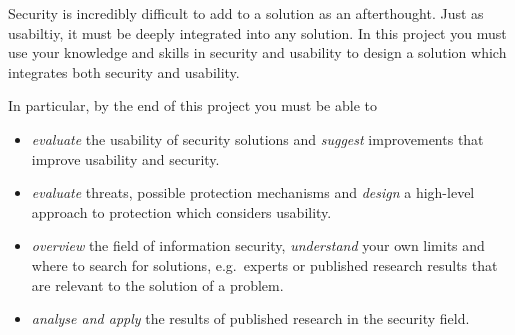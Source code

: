 Security is incredibly difficult to add to a solution as an afterthought.
Just as usabiltiy, it must be deeply integrated into any solution.
In this project you must use your knowledge and skills in security and 
usability to design a solution which integrates both security and usability.

In particular, by the end of this project you must be able to
\begin{itemize}
  \item \emph{evaluate} the usability of security solutions and \emph{suggest} 
    improvements that improve usability and security.
  \item \emph{evaluate} threats, possible protection mechanisms and 
    \emph{design} a high-level approach to protection which considers 
    usability.
  \item \emph{overview} the field of information security, \emph{understand} 
    your own limits and where to search for solutions, e.g.\ experts or 
    published research results that are relevant to the solution of a problem.
  \item \emph{analyse and apply} the results of published research in the 
    security field.
\end{itemize}
